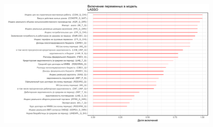 \documentclass[c, dvipsnames]{beamer}  %
\begin{document}
 \begin{frame}
\frametitle{\insertsection} 
\framesubtitle{\insertsubsection}
\begin{figure}
\includegraphics[width=\linewidth]{nzlollipop2.pdf}
\end{figure}
\end{frame} 
\end{document}
